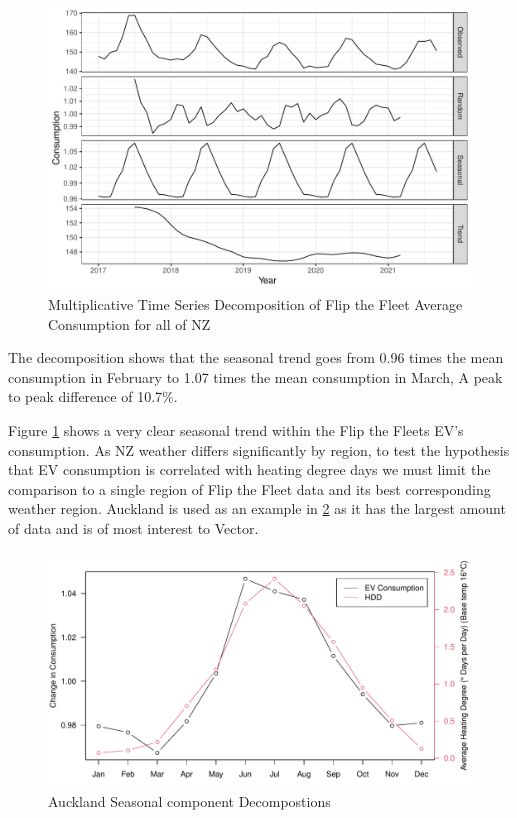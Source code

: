 \documentclass[
]{article}
\begin{document}
\begin{figure}
\centering
\includegraphics{summary_week4_files/figure-latex/consum_decomp_plot-1.pdf}
\caption{Multiplicative Time Series Decomposition of Flip the Fleet
Average Consumption for all of NZ\label{fig:consum_decomp_plot}}
\end{figure}

The decomposition shows that the seasonal trend goes from 0.96 times the
mean consumption in February to 1.07 times the mean consumption in
March, A peak to peak difference of 10.7\%.

Figure \ref{fig:consum_decomp_plot} shows a very clear seasonal trend
within the Flip the Fleets EV's consumption. As NZ weather differs
significantly by region, to test the hypothesis that EV consumption is
correlated with heating degree days we must limit the comparison to a
single region of Flip the Fleet data and its best corresponding weather
region. Auckland is used as an example in \ref{fig:eff_HDD_plot} as it
has the largest amount of data and is of most interest to Vector.

\begin{figure}
\centering
\includegraphics{summary_week4_files/figure-latex/eff_HDD_plot-1.pdf}
\caption{Auckland Seasonal component
Decompostions\label{fig:eff_HDD_plot}}
\end{figure}
\end{document}
